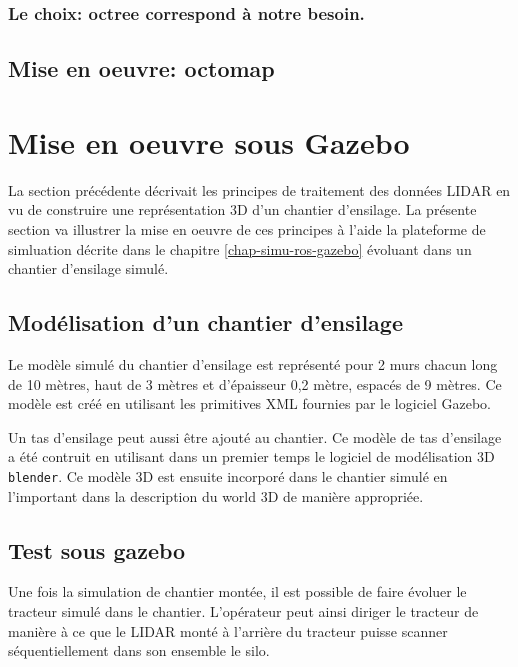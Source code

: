 \documentclass[12pt,a4paper]{report}
\begin{document}
		\subsubsection{Le choix: octree correspond à notre besoin.}
		
		\subsection{Mise en oeuvre: octomap}
		
	\section{Mise en oeuvre sous Gazebo}
	
	La section précédente décrivait les principes de traitement des données LIDAR en vu de construire une représentation 3D d'un chantier d'ensilage. La présente section va illustrer la mise en oeuvre de ces principes à l'aide la plateforme de simluation décrite dans le chapitre \ref{chap-simu-ros-gazebo} évoluant dans un chantier d'ensilage simulé.
	
		\subsection{Modélisation d'un chantier d'ensilage}
		Le modèle simulé du chantier d'ensilage est représenté pour 2 murs chacun long de 10 mètres, haut de 3 mètres et d'épaisseur 0,2 mètre, espacés de 9 mètres. Ce modèle est créé en utilisant les primitives XML fournies par le logiciel Gazebo.
		
		
		\para Un tas d'ensilage peut aussi être ajouté au chantier. Ce modèle de tas d'ensilage a été contruit en utilisant dans un premier temps le logiciel de modélisation 3D \verb|blender|. Ce modèle 3D est ensuite incorporé dans le chantier simulé en l'important dans la description du world 3D de manière appropriée.
		
		
	
	
		\subsection{Test sous gazebo}
		Une fois la simulation de chantier montée, il est possible de faire évoluer le tracteur simulé dans le chantier. L'opérateur peut ainsi diriger le tracteur de manière à ce que le LIDAR monté à l'arrière du tracteur puisse scanner séquentiellement dans son ensemble le silo.
		
\end{document}

